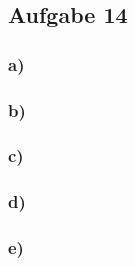 \subsection*{Aufgabe 14}
\subsubsection*{a)}

\subsubsection*{b)}

\subsubsection*{c)}

\subsubsection*{d)}

\subsubsection*{e)}
